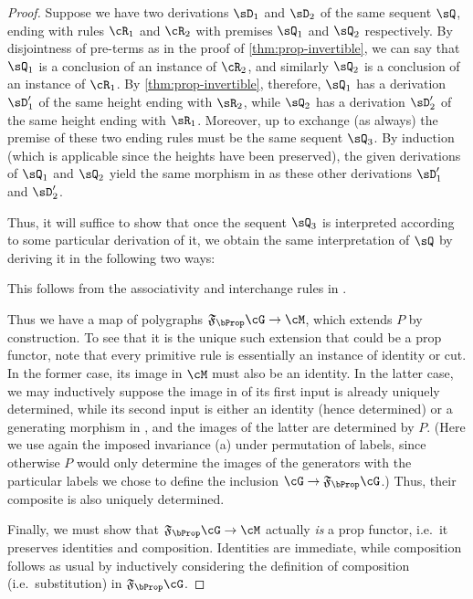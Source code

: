 \documentclass{book}
\newcommand{\F}[1]{\mathfrak{F}_{#1}}
\begin{document}
\begin{proof}
  Suppose we have two derivations $\sD_1$ and $\sD_2$ of the same sequent $\sQ$, ending with rules $\cR_1$ and $\cR_2$ with premises $\sQ_1$ and $\sQ_2$ respectively.
  By disjointness of pre-terms as in the proof of \cref{thm:prop-invertible}, we can say that $\sQ_1$ is a conclusion of an instance of $\cR_2$, and similarly $\sQ_2$ is a conclusion of an instance of $\cR_1$.
  By \cref{thm:prop-invertible}, therefore, $\sQ_1$ has a derivation $\sD_1'$ of the same height ending with $\sR_2$, while $\sQ_2$ has a derivation $\sD_2'$ of the same height ending with $\sR_1$.
  Moreover, up to exchange (as always) the premise of these two ending rules must be the same sequent $\sQ_3$.
  By induction (which is applicable since the heights have been preserved), the given derivations of $\sQ_1$ and $\sQ_2$ yield the same morphism in \cM as these other derivations $\sD_1'$ and $\sD_2'$.

  Thus, it will suffice to show that once the sequent $\sQ_3$ is interpreted according to some particular derivation of it, we obtain the same interpretation of $\sQ$ by deriving it in the following two ways:
  This follows from the associativity and interchange rules in \cM.

  Thus we have a map of polygraphs $\F\bProp\cG\to\cM$, which extends $P$ by construction.
  To see that it is the unique such extension that could be a prop functor, note that every primitive rule is essentially an instance of identity or cut.
  In the former case, its image in $\cM$ must also be an identity.
  In the latter case, we may inductively suppose the image in \cM of its first input is already uniquely determined, while its second input is either an identity (hence determined) or a generating morphism in \cG, and the images of the latter are determined by $P$.
  (Here we use again the imposed invariance (a) under permutation of labels, since otherwise $P$ would only determine the images of the generators with the particular labels we chose to define the inclusion $\cG\to\F\bProp\cG$.)
  Thus, their composite is also uniquely determined.

  Finally, we must show that $\F\bProp\cG\to\cM$ actually \emph{is} a prop functor, i.e.\ it preserves identities and composition.
  Identities are immediate, while composition follows as usual by inductively considering the definition of composition (i.e.\ substitution) in $\F\bProp\cG$.
\end{proof}
\end{document}
